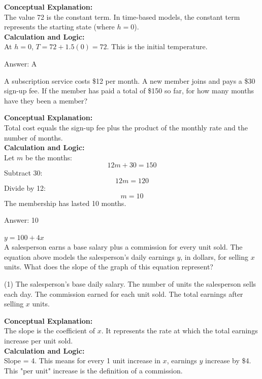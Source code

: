 \documentclass[11pt,paper=a4,answers]{exam}
\begin{document}
\begin{questions}
\begin{solution}
\textbf{Conceptual Explanation:} \\
The value 72 is the constant term. In time-based models, the constant term represents the starting state (where $h=0$).
\\[10pt]
\textbf{Calculation and Logic:} \\
At $h = 0$, $T = 72 + 1.5(0) = 72$. This is the initial temperature.

\vspace{15pt}
Answer: \colorbox{yellow!100}{A}
\end{solution}

\question
A subscription service costs \$12 per month. A new member joins and pays a \$30 sign-up fee. If the member has paid a total of \$150 so far, for how many months have they been a member?

\begin{solution}
\textbf{Conceptual Explanation:} \\
Total cost equals the sign-up fee plus the product of the monthly rate and the number of months.
\\[10pt]
\textbf{Calculation and Logic:} \\
Let $m$ be the months:
\[12m + 30 = 150\]
Subtract 30:
\[12m = 120\]
Divide by 12:
\[m = 10\]
The membership has lasted 10 months.

\vspace{15pt}
Answer: \colorbox{yellow!100}{10}
\end{solution}

\question
$y = 100 + 4x$ \\
A salesperson earns a base salary plus a commission for every unit sold. The equation above models the salesperson's daily earnings $y$, in dollars, for selling $x$ units. What does the slope of the graph of this equation represent?
\begin{tasks}(1)
    \task The salesperson's base daily salary.
    \task The number of units the salesperson sells each day.
    \task The commission earned for each unit sold.
    \task The total earnings after selling $x$ units.
\end{tasks}

\begin{solution}
\textbf{Conceptual Explanation:} \\
The slope is the coefficient of $x$. It represents the rate at which the total earnings increase per unit sold.
\\[10pt]
\textbf{Calculation and Logic:} \\
Slope = 4. 
This means for every 1 unit increase in $x$, earnings $y$ increase by \$4. This "per unit" increase is the definition of a commission.


\end{solution}
\end{questions}
\end{document}
